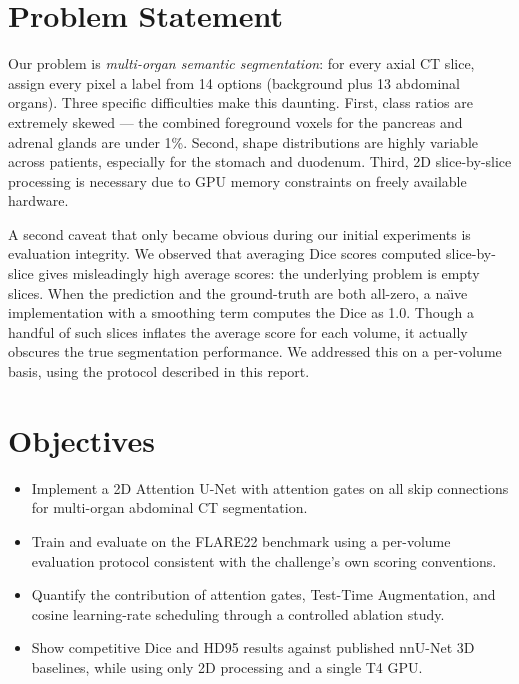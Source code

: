 \FloatBarrier

\section{Problem Statement}

Our problem is \emph{multi-organ semantic segmentation}: for every axial CT slice, assign every pixel a label from 14 options (background plus 13 abdominal organs). Three specific difficulties make this daunting. First, class ratios are extremely skewed --- the combined foreground voxels for the pancreas and adrenal glands are under 1\%. Second, shape distributions are highly variable across patients, especially for the stomach and duodenum. Third, 2D slice-by-slice processing is necessary due to GPU memory constraints on freely available hardware.

A second caveat that only became obvious during our initial experiments is evaluation integrity. We observed that averaging Dice scores computed slice-by-slice gives misleadingly high average scores: the underlying problem is empty slices. When the prediction and the ground-truth are both all-zero, a na\"\i{}ve implementation with a smoothing term computes the Dice as 1.0. Though a handful of such slices inflates the average score for each volume, it actually obscures the true segmentation performance. We addressed this on a per-volume basis, using the protocol described in this report.

\section{Objectives}

\begin{itemize}
    \item Implement a 2D Attention U-Net with attention gates on all skip connections for
          multi-organ abdominal CT segmentation.
    \item Train and evaluate on the FLARE22 benchmark using a per-volume evaluation protocol
          consistent with the challenge's own scoring conventions.
    \item Quantify the contribution of attention gates, Test-Time Augmentation, and cosine
          learning-rate scheduling through a controlled ablation study.
    \item Show competitive Dice and HD95 results against published nnU-Net 3D baselines,
          while using only 2D processing and a single T4 GPU.
\end{itemize}

